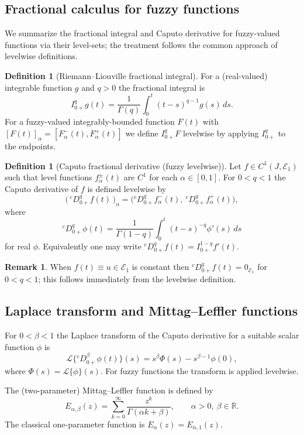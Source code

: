 \documentclass[11pt,a4paper]{article}
\theoremstyle{plain}
\theoremstyle{definition}
\newtheorem{definition}[theorem]{Definition}
\newtheorem{remark}[theorem]{Remark}
\theoremstyle{remark}
\newcommand{\E}{\mathcal{E}_1}
\newcommand{\R}{\mathbb{R}}
\begin{document}
	\subsection{Fractional calculus for fuzzy functions}
	We summarize the fractional integral and Caputo derivative for fuzzy-valued functions via their level-sets; the treatment follows the common approach of levelwise definitions.
	
	\begin{definition}[Riemann--Liouville fractional integral]
		For a (real-valued) integrable function $g$ and $q>0$ the fractional integral is
		$$I_{0+}^q g(t)=\frac{1}{\Gamma(q)}\int_0^t (t-s)^{q-1} g(s)\,ds.$$ 
		For a fuzzy-valued integrably-bounded function $F(t)$ with $[F(t)]_\alpha=[F_\alpha^-(t),F_\alpha^+(t)]$ we define $I_{0+}^q F$ levelwise by applying $I_{0+}^q$ to the endpoints.
	\end{definition}
	
	\begin{definition}[Caputo fractional derivative (fuzzy levelwise)]
		Let $f\in C^1(J,\E)$ such that level functions $f_\alpha^{\pm}(t)$ are $C^1$ for each $\alpha\in[0,1]$. For $0<q<1$ the Caputo derivative of $f$ is defined levelwise by
		$$\big(\,{}^cD_{0+}^q f(t)\,\big)_\alpha = \big({}^cD_{0+}^q f_\alpha^-(t),\ {}^cD_{0+}^q f_\alpha^+(t)\big),$$
		where
		$${}^cD_{0+}^q \phi(t)=\frac{1}{\Gamma(1-q)}\int_0^t (t-s)^{-q}\phi'(s)\,ds$$
		for real $\phi$. Equivalently one may write ${}^cD_{0+}^q f(t)=I_{0+}^{1-q} f'(t)$.
	\end{definition}
	
	\begin{remark}
		When $f(t)\equiv u\in\E$ is constant then ${}^cD_{0+}^q f(t)=0_{\E}$ for $0<q<1$; this follows immediately from the levelwise definition.
	\end{remark}
	
	\subsection{Laplace transform and Mittag--Leffler functions}
	For $0<\beta<1$ the Laplace transform of the Caputo derivative for a suitable scalar function $\phi$ is
	$$\mathcal{L}\{ {}^cD_{0+}^{\beta}\phi(t)\}(s)=s^{\beta}\Phi(s)-s^{\beta-1}\phi(0),$$
	where $\Phi(s)=\mathcal{L}\{\phi\}(s)$. For fuzzy functions the transform is applied levelwise.
	
	The (two-parameter) Mittag--Leffler function is defined by
	$$E_{\alpha,\beta}(z)=\sum_{k=0}^\infty\frac{z^k}{\Gamma(\alpha k+\beta)},\qquad \alpha>0,\ \beta\in\R.$$ 
	The classical one-parameter function is $E_\alpha(z)=E_{\alpha,1}(z)$.
	
\end{document}
